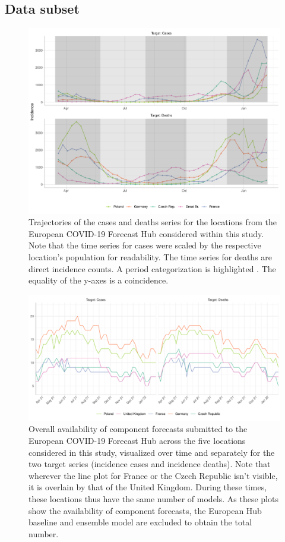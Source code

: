 \subsection{Data subset} \label{sub:hub_data}
\begin{figure}
\includegraphics[width = \textwidth]{../plots/trajectories.pdf}
\caption{Trajectories of the cases and deaths series for the locations from the European COVID-19 Forecast Hub considered within this study. Note that the time series for cases were scaled by the respective location's population for readability. The time series for deaths are direct incidence counts.  A period categorization is highlighted . The equality of the y-axes is a coincidence.}
\label{fig:trajectories}
\end{figure}
\begin{figure}
\includegraphics[width = \textwidth]{../plots/availability_overall.pdf}
\caption{Overall availability of component forecasts submitted to the European COVID-19 Forecast Hub across the five locations considered in this study, visualized over time and separately for the two target series (incidence cases and incidence deaths). Note that wherever the line plot for France or the Czech Republic isn't visible, it is overlain by that of the United Kingdom. During these times, these locations thus have the same number of models. As these plots show the availability of component forecasts, the European Hub baseline and ensemble model are excluded to obtain the total number.}
\label{fig:avail_ovrl}
\end{figure}
